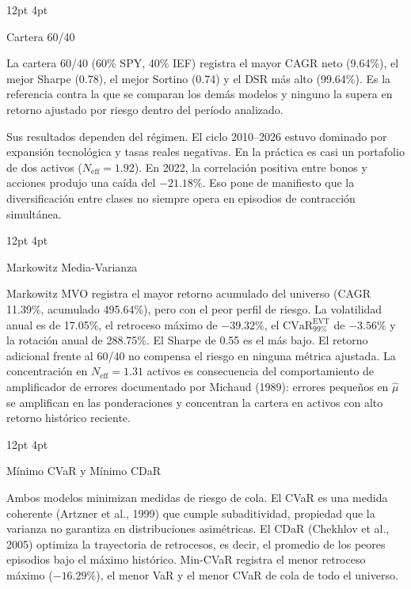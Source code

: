 \documentclass[11pt,a4paper]{article}
\makeatletter
\renewcommand\subsection{\@startsection{subsection}{2}{\z@}%
  {12pt \@plus 2pt \@minus 1pt}%
  {4pt}%
  {\raggedright\normalsize\bfseries\color{navyblue}}}
\makeatother
\begin{document}
\subsection{Cartera 60/40}

La cartera 60/40 (60\% SPY, 40\% IEF) registra el mayor CAGR neto (9.64\%), el mejor Sharpe (0.78), el mejor Sortino (0.74) y el DSR más alto (99.64\%). Es la referencia contra la que se comparan los demás modelos y ninguno la supera en retorno ajustado por riesgo dentro del período analizado.

Sus resultados dependen del régimen. El ciclo 2010--2026 estuvo dominado por expansión tecnológica y tasas reales negativas. En la práctica es casi un portafolio de dos activos ($N_{\text{eff}} = 1.92$). En 2022, la correlación positiva entre bonos y acciones produjo una caída del $-21.18\%$. Eso pone de manifiesto que la diversificación entre clases no siempre opera en episodios de contracción simultánea.

\subsection{Markowitz Media-Varianza}

Markowitz MVO registra el mayor retorno acumulado del universo (CAGR 11.39\%, acumulado 495.64\%), pero con el peor perfil de riesgo. La volatilidad anual es de 17.05\%, el retroceso máximo de $-39.32\%$, el $\text{CVaR}_{99\%}^{\text{EVT}}$ de $-3.56\%$ y la rotación anual de 288.75\%. El Sharpe de 0.55 es el más bajo. El retorno adicional frente al 60/40 no compensa el riesgo en ninguna métrica ajustada. La concentración en $N_{\text{eff}} = 1.31$ activos es consecuencia del comportamiento de amplificador de errores documentado por Michaud (1989): errores pequeños en $\hat{\mu}$ se amplifican en las ponderaciones y concentran la cartera en activos con alto retorno histórico reciente.

\subsection{Mínimo CVaR y Mínimo CDaR}

Ambos modelos minimizan medidas de riesgo de cola. El CVaR es una medida coherente (Artzner et al., 1999) que cumple subaditividad, propiedad que la varianza no garantiza en distribuciones asimétricas. El CDaR (Chekhlov et al., 2005) optimiza la trayectoria de retrocesos, es decir, el promedio de los peores episodios bajo el máximo histórico. Min-CVaR registra el menor retroceso máximo ($-16.29\%$), el menor VaR y el menor CVaR de cola de todo el universo.
\end{document}
